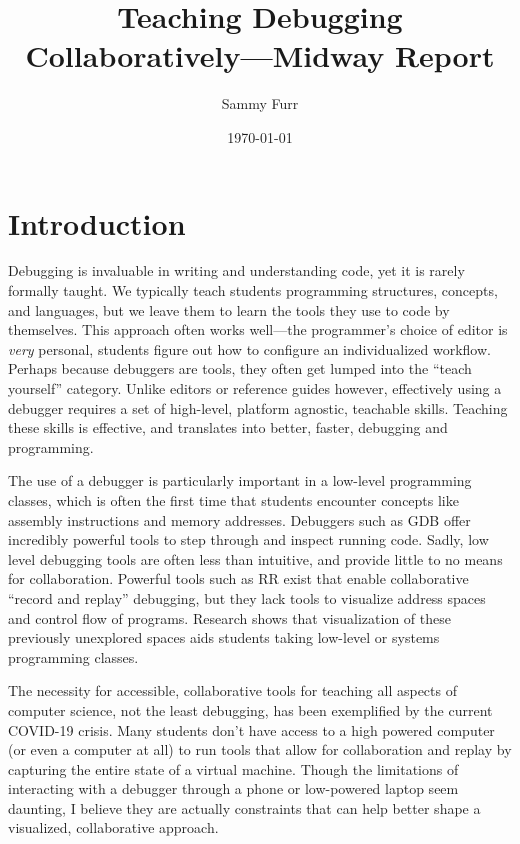 \documentclass[12pt]{article}
\author{Sammy Furr}
\title{Teaching Debugging Collaboratively---Midway Report}
\date{\today}
\begin{document}
\begin{titlepage}
\maketitle
\end{titlepage}

\section{Introduction}

Debugging is invaluable in writing and understanding code, yet it is
rarely formally taught\cite{doi:10.1080/08993400802114581}.  We
typically teach students programming structures, concepts, and
languages, but we leave them to learn the tools they use to code by
themselves.  This approach often works well---the programmer's choice
of editor is \textit{very} personal, students figure out how to
configure an individualized workflow.  Perhaps because debuggers are
tools, they often get lumped into the ``teach yourself'' category.
Unlike editors or reference guides however, effectively using a
debugger requires a set of high-level, platform agnostic, teachable
skills.  Teaching these skills is effective, and translates into
better, faster, debugging and
programming\cite{10.1145/3286960.3286970}\cite{10.1145/3361721.3361724}.\par

The use of a debugger is particularly important in a low-level
programming classes, which is often the first time that students
encounter concepts like assembly instructions and memory addresses.
Debuggers such as GDB offer incredibly powerful tools to step through
and inspect running code.  Sadly, low level debugging tools are often
less than intuitive, and provide little to no means for collaboration.
Powerful tools such as RR exist that enable collaborative ``record and
replay'' debugging\cite{DBLP:journals/corr/OCallahanJFHNP17}, but they
lack tools to visualize address spaces and control flow of programs.
Research shows that visualization of these previously unexplored
spaces aids students taking low-level or systems programming
classes\cite{10.1145/3328778.3366894}.\par

The necessity for accessible, collaborative tools for teaching all
aspects of computer science, not the least debugging, has been
exemplified by the current COVID-19 crisis.  Many students don't have
access to a high powered computer (or even a computer at all) to run
tools that allow for collaboration and replay by capturing the entire
state of a virtual machine\cite{10.1145/2843859.2843867}.  Though the
limitations of interacting with a debugger through a phone or
low-powered laptop seem daunting, I believe they are actually
constraints that can help better shape a visualized, collaborative
approach.\par
\end{document}
